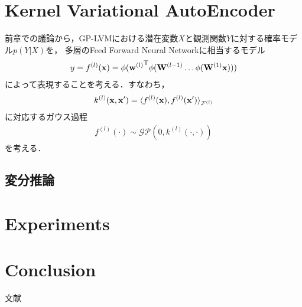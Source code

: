 \documentclass[11pt,a4j]{article}
\begin{document}
  \section{Kernel Variational AutoEncoder}
    前章での議論から，GP-LVMにおける潜在変数$X$と観測関数$Y$に対する確率モデル$p(Y|X)$を，
    多層のFeed Forward Neural Networkに相当するモデル
    \begin{align}
      y = f^{(l)} ({\bf x}) = \phi( {{\bf w}^{(l)}}^{\mathrm{T}} \phi( {\bf W}^{(l-1)}  \dots \phi( {\bf W}^{(1)} {\bf x}) ) )
    \end{align}
    によって表現することを考える．すなわち，
    \begin{align}
      k^{(l)}( {\bf x}, {\bf x}' ) = { \langle f^{(l)} ({\bf x}), f^{(l)} ({\bf x}') \rangle }_{\mathcal{F}^{(l)}}
    \end{align}
    に対応するガウス過程
    \begin{align}
      f^{(l)}(\cdot) \sim \mathcal{GP}(0, k^{(l)}(\cdot,\cdot))
    \end{align}
    を考える．

    \subsection{変分推論}

  \section{Experiments}
  \section{Conclusion}
    文献\cite{Hinton1995BayesianLF}
    \cite{DLGP2018} \cite{KMDL2009} \cite{LawrenceGPLVM2004} \cite{LawrenceGPLVM2005}
    \cite{SparseGP2006} \cite{VariationalSparseGP2009} \cite{BayesGP2010}
    \cite{GPBIGDATA2013}


  
\end{document}
